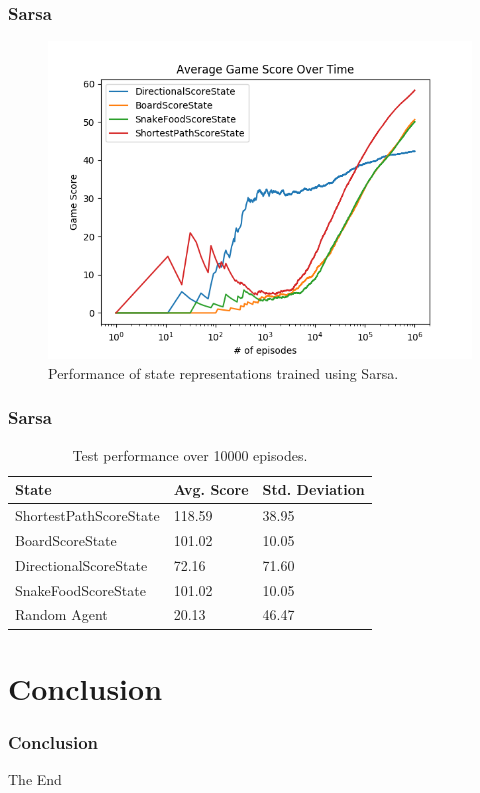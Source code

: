 \documentclass{beamer}
\begin{document}
    \begin{frame}
        \frametitle{Sarsa}
        \begin{figure}[ht]
            \centering
            \includegraphics[width=0.8\linewidth]{../images/sarsa/state/42/state_sarsa_average_game_score_over_time.png}
            \caption{Performance of state representations trained using Sarsa.}
            \label{fig:state_sarsa}
        \end{figure}

    \end{frame}

    \begin{frame}
        \frametitle{Sarsa}
        \begin{table}[ht]
            \centering
            \begin{tabular}{ | l | l | l | }
                \hline
                State & Avg. Score & Std. Deviation \\ \hline
                ShortestPathScoreState & 118.59 & 38.95 \\ \hline
                BoardScoreState & 101.02 & 10.05 \\ \hline
                DirectionalScoreState & 72.16 & 71.60 \\ \hline
                SnakeFoodScoreState & 101.02 & 10.05 \\ \hline
                Random Agent & 20.13 & 46.47 \\
                \hline
            \end{tabular}
            \caption{Test performance over 10000 episodes.}
            \label{table:state_sarsa}
        \end{table}
    \end{frame}

    \section{Conclusion}

    \begin{frame}
        \frametitle{Conclusion}

    \end{frame}

    \begin{frame}
        \Huge{\centerline{The End}}
    \end{frame}
\end{document}
